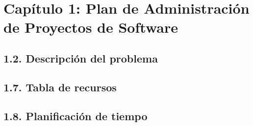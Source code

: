 
\newpage
\section{Capítulo 1: Plan de Administración de Proyectos de Software}\label{cap:paps}



\subsection{1.2. Descripción del problema}\label{sec:descripcion_problema_paps}










\subsection{1.7. Tabla de recursos}\label{sec:tabla_recursos_paps}


\subsection{1.8. Planificación de tiempo}\label{sec:planificacion_tiempo_paps}



